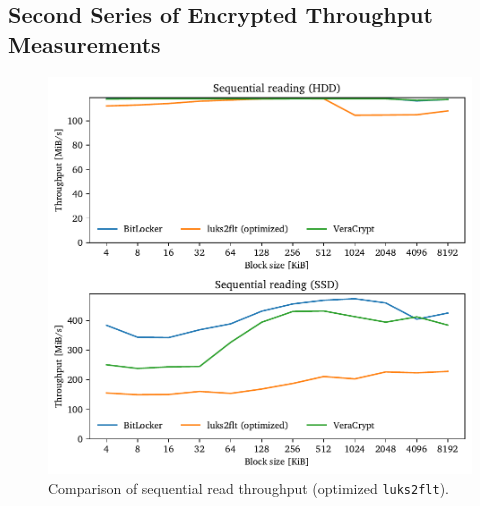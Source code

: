 \subsection{Second Series of Encrypted Throughput Measurements}
\label{chap:performance.hwexperiments.encryptedseries2}

\begin{figure}[htb!]
	\center
	\includegraphics[scale=1]{../fig/performance.hwexperiments.optseq.pdf}
	\caption[
		Comparison of sequential read throughput (optimized \texttt{luks2flt})
	]{
		Comparison of sequential read throughput (optimized \texttt{luks2flt}). 
	}
	\label{fig:performance.hwexperiments.optseq}
\end{figure}

